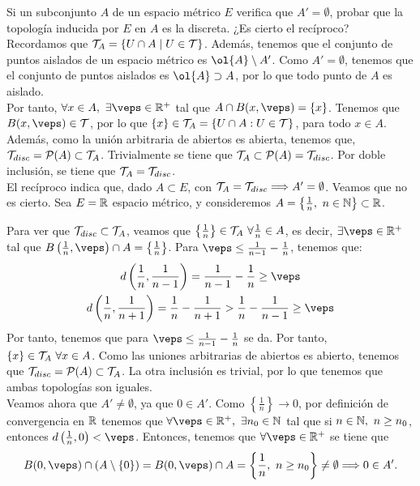 \begin{ejercicio}
    Si un subconjunto $A$ de un espacio métrico $E$ verifica que $A'=\emptyset$, probar que la topología inducida por $E$ en $A$ es la discreta. ¿Es cierto el recíproco?\\

    Recordamos que $\mathcal{T}_A=\{U\cap A\mid U\in \mathcal{T}\}$. Además, tenemos que el conjunto de puntos aislados de un espacio métrico es $\ol{A}\setminus A'$. Como $A'=\emptyset$, tenemos que el conjunto de puntos aislados es $\ol{A}\supset A$, por lo que todo punto de $A$ es aislado.\\

    Por tanto, $\forall x\in A,~\exists \veps\in \bb{R}^+$ tal que $A\cap B(x,\veps)=\{x\}$. Tenemos que $B(x,\veps)\in \cc{T}$, por lo que $\{x\}\in \mathcal{T}_A = \{U\cap A : U\in \mathcal{T}\}$, para todo $x\in A$. Además, como la unión arbitraria de abiertos es abierta, tenemos que, $\mathcal{T}_{disc}=\mathcal{P}(A)\subset \mathcal{T}_A$. Trivialmente se tiene que $\mathcal{T}_A\subset \mathcal{P}(A)=\mathcal{T}_{disc}$. Por doble inclusión, se tiene que $\mathcal{T}_A=\mathcal{T}_{disc}$.\\

    El recíproco indica que, dado $A\subset E$, con $\mathcal{T}_A=\mathcal{T}_{disc}\Longrightarrow A'=\emptyset$. Veamos que no es cierto. Sea $E=\mathbb{R}$ espacio métrico, y consideremos $A=\left\{\frac{1}{n},~n\in \mathbb{N}\right\}\subset \mathbb{R}$.

    Para ver que $\mathcal{T}_{disc}\subset \mathcal{T}_A$, veamos que $\left\{\frac{1}{n}\right\}\in \mathcal{T}_A~\forall \frac{1}{n}\in A$, es decir, $\exists \veps\in \bb{R}^+$ tal que $B\left(\frac{1}{n},\veps\right)\cap A=\left\{\frac{1}{n}\right\}$. Para $\veps\leq \frac{1}{n-1}-\frac{1}{n}$, tenemos que:
    \begin{gather*}
        d\left(\frac{1}{n},\frac{1}{n-1}\right) = \frac{1}{n-1}-\frac{1}{n} \geq \veps \\
        d\left(\frac{1}{n},\frac{1}{n+1}\right) = \frac{1}{n}-\frac{1}{n+1} > \frac{1}{n} - \frac{1}{n-1} \geq \veps
    \end{gather*}
    Por tanto, tenemos que para $\veps\leq \frac{1}{n-1}-\frac{1}{n}$ se da. Por tanto, $\left\{x\right\}\in \mathcal{T}_A~\forall x\in A$. Como las uniones arbitrarias de abiertos es abierto, tenemos que $\mathcal{T}_{disc}=\mathcal{P}(A)\subset \mathcal{T}_{A}$. La otra inclusión es trivial, por lo que tenemos que ambas topologías son iguales.\\

    Veamos ahora que $A'\neq \emptyset$, ya que $0\in A'$. Como $\left\{\frac{1}{n}\right\}\to 0$, por definición de convergencia en $\mathbb{R}$ tenemos que $\forall \veps\in \bb{R}^+,~\exists n_0\in \bb{N}$ tal que si $n\in \mathbb{N},~n\geq n_0$, entonces $d\left(\frac{1}{n},0\right)<\veps$. Entonces, tenemos que $\forall \veps\in \bb{R}^+$ se tiene que $$B(0,\veps)\cap (A\setminus \{0\})=B(0,\veps)\cap A = \left\{\frac{1}{n},~n\geq n_0\right\}\neq \emptyset\Longrightarrow 0\in A'.$$
\end{ejercicio}

